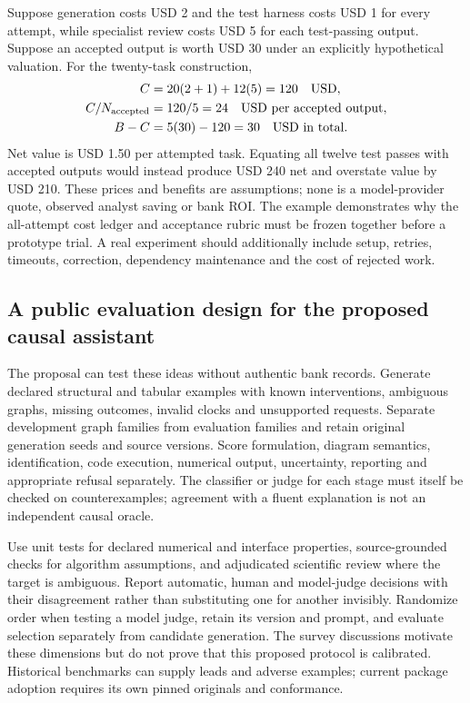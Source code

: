 Suppose generation costs USD 2 and the test harness costs USD 1 for every
attempt, while specialist review costs USD 5 for each test-passing output.
Suppose an accepted output is worth USD 30 under an explicitly hypothetical
valuation. For the twenty-task construction,
\begin{align}
 C&=20(2+1)+12(5)=120\quad\text{USD},
 \label{exec19:evalcode-costs}\\
 C/N_{\rm accepted}&=120/5=24\quad\text{USD per accepted output},
 \label{exec19:evalcode-unitcost}\\
 B-C&=5(30)-120=30\quad\text{USD in total}.
 \label{exec19:evalcode-net}
\end{align}
Net value is USD 1.50 per attempted task. Equating all twelve test passes with
accepted outputs would instead produce USD 240 net and overstate value by
USD 210. These prices and benefits are assumptions; none is a model-provider
quote, observed analyst saving or bank ROI. The example demonstrates why the
all-attempt cost ledger and acceptance rubric must be frozen together before
a prototype trial. A real experiment should additionally include setup, retries,
timeouts, correction, dependency maintenance and the cost of rejected work.
\citep{exec19_surveys_reference}

\subsection{A public evaluation design for the proposed causal assistant}

The proposal can test these ideas without authentic bank records. Generate
declared structural and tabular examples with known interventions, ambiguous
graphs, missing outcomes, invalid clocks and unsupported requests. Separate
development graph families from evaluation families and retain original
generation seeds and source versions. Score formulation, diagram semantics,
identification, code execution, numerical output, uncertainty, reporting and
appropriate refusal separately. The classifier or judge for each stage must
itself be checked on counterexamples; agreement with a fluent explanation is
not an independent causal oracle.

Use unit tests for declared numerical and interface properties, source-grounded
checks for algorithm assumptions, and adjudicated scientific review where the
target is ambiguous. Report automatic, human and model-judge decisions with
their disagreement rather than substituting one for another invisibly.
Randomize order when testing a model judge, retain its version and prompt, and
evaluate selection separately from candidate generation. The survey discussions
motivate these dimensions but do not prove that this proposed protocol is
calibrated. Historical benchmarks can supply leads and adverse examples;
current package adoption requires its own pinned originals and conformance.
\citep{exec19_surveys_evaluation,exec19_surveys_code}

